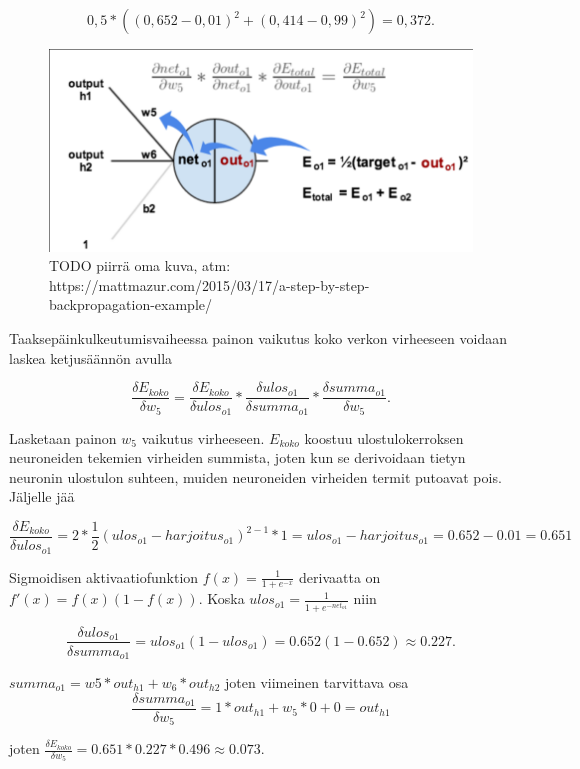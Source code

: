 \documentclass[finnish]{tktltiki2}
\theoremstyle{definition}
\theoremstyle{remark}
\begin{document}
  $$ 0,5 * ( (0,652 - 0,01)^2 + (0,414 - 0,99)^2 ) = 0,372. $$
  
    \begin{figure}[h]
    \centering
    \includegraphics[scale=0.4]{chain-rule}
    \caption{TODO piirrä oma kuva, atm: https://mattmazur.com/2015/03/17/a-step-by-step-backpropagation-example/}
    \label{pic:chain-rule}
    \end{figure}

  Taaksepäinkulkeutumisvaiheessa painon vaikutus koko verkon virheeseen voidaan laskea ketjusäännön avulla

  $$ \frac{\delta E_{koko}}{\delta w_5} = \frac{\delta E_{koko}}{\delta ulos_{o1}} * \frac{\delta ulos_{o1}}{\delta summa_{o1}} * \frac{\delta summa_{o1}}{\delta w_5}. $$

  Lasketaan painon $w_5$ vaikutus virheeseen. $E_{koko}$ koostuu ulostulokerroksen neuroneiden tekemien virheiden summista, joten kun se derivoidaan tietyn neuronin ulostulon suhteen, muiden neuroneiden virheiden termit putoavat pois. Jäljelle jää 
  
  $$ \frac{\delta E_{koko}}{\delta ulos_{o1}} = 2 * \frac{1}{2} (ulos_{o1} - harjoitus_{o1})^{2-1} * 1 = ulos_{o1} - harjoitus_{o1} = 0.652 - 0.01 = 0.651$$

  Sigmoidisen aktivaatiofunktion $ f(x) = \frac{1}{1 + e^{-x}}$ derivaatta on $f'(x) = f(x)(1 - f(x))$.
  Koska $ ulos_{o1} = \frac{1}{1+e^{-net_{o1}}} $ niin

  $$ \frac{\delta ulos_{o1}}{\delta summa_{o1}} = ulos_{o1}(1 - ulos_{o1}) = 0.652(1 - 0.652) \approx 0.227.$$

  $ summa_{o1} = w5 * out_{h1} + w_6 * out_{h2} $ joten viimeinen tarvittava osa 
  $$ \frac{\delta summa_{o1}}{\delta w_5} = 1 * out_{h1} + w_5 * 0 + 0 = out_{h1} $$ 

  joten $\frac{\delta E_{koko}}{\delta w_5} = 0.651 * 0.227 * 0.496 \approx 0.073 $.
\end{document}
